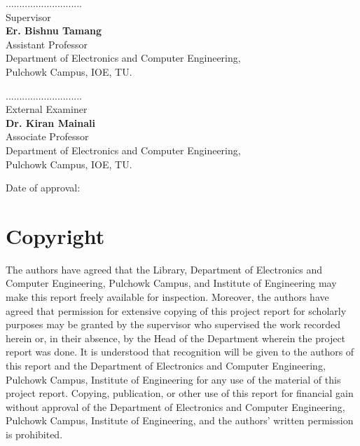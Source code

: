\documentclass[12pt]{report}
\begin{document}
\vspace{1.5cm}
\begin{minipage}{.5\textwidth}
    \raggedright
    ............................\\
    Supervisor\\
    \textbf{Er. Bishnu Tamang}\\
    Assistant Professor\\
    Department of Electronics and Computer Engineering,\\
    Pulchowk Campus, IOE, TU.
\end{minipage}%
\begin{minipage}{0.5\textwidth}
    \raggedleft
    ............................\\
    External Examiner\\
    \textbf{Dr. Kiran Mainali}\\
    Associate Professor\\
    Department of Electronics and Computer Engineering,\\
    Pulchowk Campus, IOE, TU.
\end{minipage}

\vspace{1.5cm}
\centerline{Date of approval: \underline{\hspace{5cm}}}

\chapter*{Copyright}
The authors have agreed that the Library, Department of Electronics and Computer
Engineering, Pulchowk Campus, and Institute of Engineering may make this report freely
available for inspection. Moreover, the authors have agreed that permission for
extensive copying of this project report for scholarly purposes may be granted by the
supervisor who supervised the work recorded herein or, in their absence, by the Head of
the Department wherein the project report was done. It is understood that recognition
will be given to the authors of this report and the Department of Electronics and
Computer Engineering, Pulchowk Campus, Institute of Engineering for any use of the
material of this project report. Copying, publication, or other use of this report for
financial gain without approval of the Department of Electronics and Computer
Engineering, Pulchowk Campus, Institute of Engineering, and the authors' written
permission is prohibited.
\end{document}
